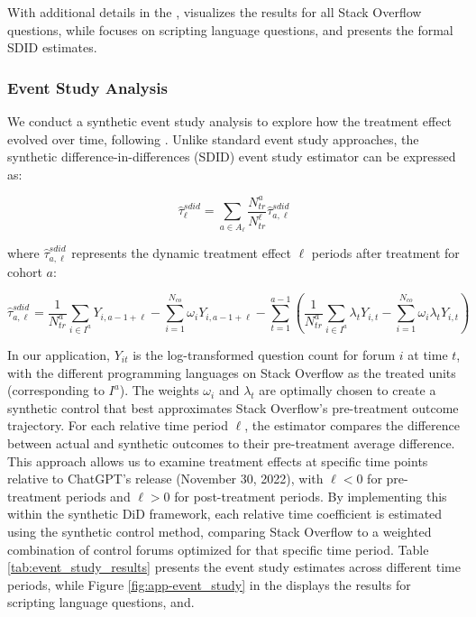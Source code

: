 With additional details in the ,  visualizes the results for all Stack Overflow questions, while  focuses on scripting language questions, and  presents the formal SDID estimates.


\subsubsection{Event Study Analysis}
We conduct a synthetic event study analysis to explore how the treatment effect evolved over time, following \textcite{ciccia_short_2024}. Unlike standard event study approaches, the synthetic difference-in-differences (SDID) event study estimator can be expressed as:

\begin{equation}
    \hat{\tau}^{sdid}_{\ell} = \sum_{a \in A_{\ell}} \frac{N^a_{tr}}{N^{\ell}_{tr}} \hat{\tau}^{sdid}_{a,\ell}
\end{equation}

where $\hat{\tau}^{sdid}_{a,\ell}$ represents the dynamic treatment effect $\ell$ periods after treatment for cohort $a$:

\begin{equation}
    \hat{\tau}^{sdid}_{a,\ell} = \frac{1}{N^a_{tr}} \sum_{i \in I^a} Y_{i,a-1+\ell} - \sum_{i=1}^{N_{co}} \omega_i Y_{i,a-1+\ell} - \sum_{t=1}^{a-1} \left( \frac{1}{N^a_{tr}} \sum_{i \in I^a} \lambda_t Y_{i,t} - \sum_{i=1}^{N_{co}} \omega_i \lambda_t Y_{i,t} \right)
\end{equation}

In our application, $Y_{it}$ is the log-transformed question count for forum $i$ at time $t$, with the different programming languages on Stack Overflow as the treated units (corresponding to $I^a$). The weights $\omega_i$ and $\lambda_t$ are optimally chosen to create a synthetic control that best approximates Stack Overflow's pre-treatment outcome trajectory. For each relative time period $\ell$, the estimator compares the difference between actual and synthetic outcomes to their pre-treatment average difference.\\

This approach allows us to examine treatment effects at specific time points relative to ChatGPT's release (November 30, 2022), with $\ell < 0$ for pre-treatment periods and $\ell > 0$ for post-treatment periods. By implementing this within the synthetic DiD framework, each relative time coefficient is estimated using the synthetic control method, comparing Stack Overflow to a weighted combination of control forums optimized for that specific time period. Table \ref{tab:event_study_results} presents the event study estimates across different time periods, while Figure \ref{fig:app-event_study} in the  displays the results for scripting language questions, and.

